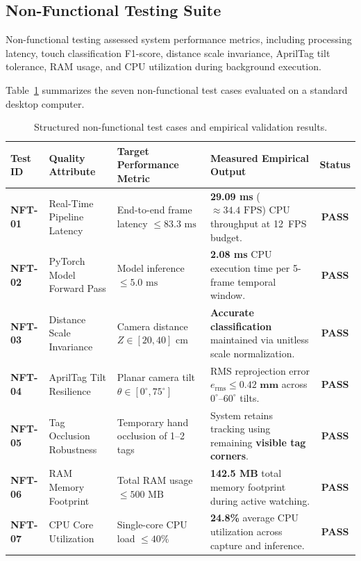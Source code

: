 \subsection{Non-Functional Testing Suite}
\label{subsec:test_non_functional}
Non-functional testing assessed system performance metrics, including processing latency, touch classification F1-score, distance scale invariance, AprilTag tilt tolerance, RAM usage, and CPU utilization during background execution.

Table~\ref{tab:non_functional_test_cases} summarizes the seven non-functional test cases evaluated on a standard desktop computer.

\begin{table}[htbp]
\centering
\caption{Structured non-functional test cases and empirical validation results.}
\label{tab:non_functional_test_cases}
\begin{tabular}{p{1.4cm} p{3.2cm} p{4.0cm} p{4.5cm} c}
\toprule
\textbf{Test ID} & \textbf{Quality Attribute} & \textbf{Target Performance Metric} & \textbf{Measured Empirical Output} & \textbf{Status} \\
\midrule
\textbf{NFT-01} & Real-Time Pipeline Latency & End-to-end frame latency $\le 83.3\text{ ms}$ & \textbf{29.09 ms} ($\approx 34.4\text{ FPS}$) CPU throughput at 12~FPS budget. & \textbf{PASS} \\
\midrule
\textbf{NFT-02} & PyTorch Model Forward Pass & Model inference $\le 5.0\text{ ms}$ & \textbf{2.08 ms} CPU execution time per 5-frame temporal window. & \textbf{PASS} \\
\midrule
\textbf{NFT-03} & Distance Scale Invariance & Camera distance $Z \in [20, 40]\text{ cm}$ & \textbf{Accurate classification} maintained via unitless scale normalization. & \textbf{PASS} \\
\midrule
\textbf{NFT-04} & AprilTag Tilt Resilience & Planar camera tilt $\theta \in [0^\circ, 75^\circ]$ & RMS reprojection error $e_{\text{rms}} \le \mathbf{0.42\text{ mm}}$ across $0^\circ$--$60^\circ$ tilts. & \textbf{PASS} \\
\midrule
\textbf{NFT-05} & Tag Occlusion Robustness & Temporary hand occlusion of 1--2 tags & System retains tracking using remaining \textbf{visible tag corners}. & \textbf{PASS} \\
\midrule
\textbf{NFT-06} & RAM Memory Footprint & Total RAM usage $\le 500\text{ MB}$ & \textbf{142.5 MB} total memory footprint during active watching. & \textbf{PASS} \\
\midrule
\textbf{NFT-07} & CPU Core Utilization & Single-core CPU load $\le 40\%$ & \textbf{24.8\%} average CPU utilization across capture and inference. & \textbf{PASS} \\
\bottomrule
\end{tabular}%
\end{table}

